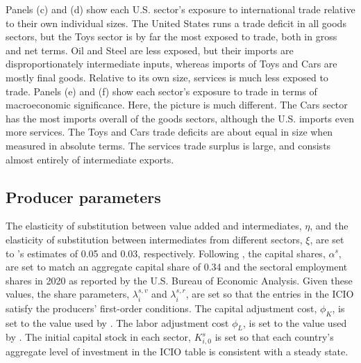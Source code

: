 \documentclass[12pt]{article}
\begin{document}
Panels (c) and (d) show each U.S. sector's exposure to international trade relative to their own individual sizes. The United States runs a trade deficit in all goods sectors, but the Toys sector is by far the most exposed to trade, both in gross and net terms. Oil and Steel are less exposed, but their imports are disproportionately intermediate inputs, whereas imports of Toys and Cars are mostly final goods. Relative to its own size, services is much less exposed to trade. Panels (e) and (f) show each sector's exposure to trade in terms of macroeconomic significance. Here, the picture is much different. The Cars sector has the most imports overall of the goods sectors, although the U.S. imports even more services. The Toys and Cars trade deficits are about equal in size when measured in absolute terms. The services trade surplus is large, and consists almost entirely of intermediate exports.



\subsection{Producer parameters}
The elasticity of substitution between value added and intermediates, $\eta$, and the elasticity of substitution between intermediates from different sectors, $\xi$, are set to \citet{atalay}'s estimates of 0.05 and 0.03, respectively. Following \citet{KRS_2018}, the capital shares, $\alpha^s$, are set to match an aggregate capital share of 0.34 and the sectoral employment shares in 2020 as reported by the U.S. Bureau of Economic Analysis. Given these values, the share parameters, $\lambda^{s,v}_i$ and $\lambda^{s,r}_i$, are set so that the entries in the ICIO satisfy the producers' first-order conditions. The capital adjustment cost, $\phi_K$, is set to the value used by \citet{gsg-dsd}. The labor adjustment cost $\phi_L$, is set to the value used by \citet{KR_2009}. The initial capital stock in each sector, $K^s_{i,0}$ is set so that each country's aggregate level of investment in the ICIO table is consistent with a steady state.
\end{document}
